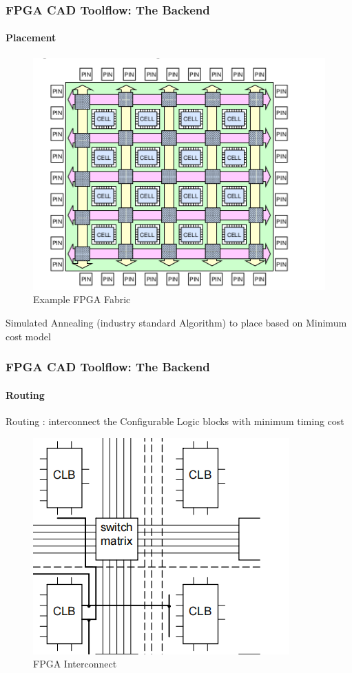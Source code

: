\documentclass{beamer}
\begin{document}
\begin{frame}[fragile]
  \frametitle{FPGA CAD Toolflow: The Backend}
  \framesubtitle{Placement}
  \begin{figure}
    \centering
    \includegraphics[width=0.5\linewidth]{images/FPGA_Fabric.png}
    \caption{Example FPGA Fabric}
    \label{exa-fabric}
  \end{figure}

  Simulated Annealing (industry standard Algorithm) to place based on Minimum cost model 
\end{frame}

\begin{frame}[fragile]
  \frametitle{FPGA CAD Toolflow: The Backend}
  \framesubtitle{Routing}
  Routing : interconnect the Configurable Logic  blocks with minimum timing cost 
  \begin{figure}
    \centering
    \includegraphics[width=0.5\linewidth]{images/switch_matrix.png}
    \caption{FPGA Interconnect }
    \label{exa_interconnect}
  \end{figure}
\end{frame}
\end{document}
